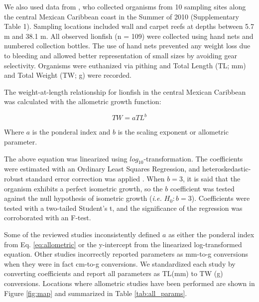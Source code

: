 \documentclass[fleqn,10pt,lineno]{wlpeerj} %
\begin{document}
We also used data from \citet{villaseorderbez_2014}, who collected
organisms from 10 sampling sites along the central Mexican Caribbean
coast in the Summer of 2010 (Supplementary Table 1). Sampling locations
included wall and carpet reefs at depths between 5.7 m and 38.1 m. All
observed lionfish (n = 109) were collected using hand nets and numbered
collection bottles. The use of hand nets prevented any weight loss due
to bleeding and allowed better representation of small sizes by avoiding
gear selectivity. Organisms were euthanized via pithing and Total Length
(TL; mm) and Total Weight (TW; g) were recorded.

\clearpage

The weight-at-length relationship for lionfish in the central Mexican
Caribbean was calculated with the allometric growth function:

\begin{equation}
\label{eq:allometric}
TW = aTL^b
\end{equation}

Where \(a\) is the ponderal index and \(b\) is the scaling exponent or
allometric parameter.

The above equation was linearized using \(log_{10}\)-transformation. The
coefficients were estimated with an Ordinary Least Squares Regression,
and heteroskedastic-robust standard error correction was applied
\citep{zeileis_2004}. When \(b = 3\), it is said that the organism
exhibits a perfect isometric growth, so the \(b\) coefficient was tested
against the null hypothesis of isometric growth (\emph{i.e.}
\(H_0: b = 3\)). Coefficients were tested with a two-tailed Student's t,
and the significance of the regression was corroborated with an F-test.

Some of the reviewed studies inconsistently defined \(a\) as either the
ponderal index from Eq. \ref{eq:allometric} or the y-intercept from the
linearized log-transformed equation. Other studies incorrectly reported
parameters as mm-to-g conversions when they were in fact cm-to-g
conversions. We standardized each study by converting coefficients and
report all parameters as TL(mm) to TW (g) conversions. Locations where
allometric studies have been performed are shown in Figure \ref{fig:map}
and summarized in Table \ref{tab:all_params}.
\end{document}
